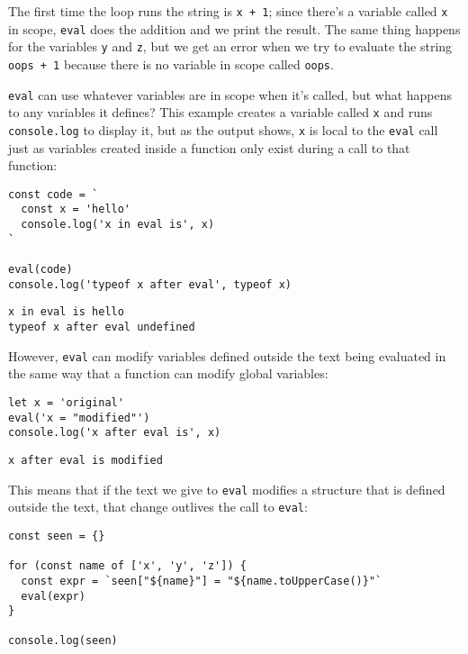 \documentclass[krantzl]{krantz}
\begin{document}
\noindent The first time the loop runs the string is \texttt{{\textquotesingle}x + 1{\textquotesingle}};
since there’s a variable called \texttt{x} in scope,
\texttt{eval} does the addition and we print the result.
The same thing happens for the variables \texttt{y} and \texttt{z},
but we get an error when we try to evaluate the string \texttt{{\textquotesingle}oops + 1{\textquotesingle}}
because there is no variable in scope called \texttt{oops}.


\texttt{eval} can use whatever variables are in scope when it’s called,
but what happens to any variables it defines?
This example creates a variable called \texttt{x} and runs \texttt{console.log} to display it,
but as the output shows,
\texttt{x} is local to the \texttt{eval} call
just as variables created inside a function
only exist during a call to that function:


\begin{lstlisting}[frame=tblr]
const code = `
  const x = 'hello'
  console.log('x in eval is', x)
`

eval(code)
console.log('typeof x after eval', typeof x)
\end{lstlisting}



\begin{lstlisting}[frame=tblr,backgroundcolor=\color{black!5}]
x in eval is hello
typeof x after eval undefined
\end{lstlisting}



However,
\texttt{eval} can modify variables defined outside the text being evaluated
in the same way that a function can modify global variables:


\begin{lstlisting}[frame=tblr]
let x = 'original'
eval('x = "modified"')
console.log('x after eval is', x)
\end{lstlisting}



\begin{lstlisting}[frame=tblr,backgroundcolor=\color{black!5}]
x after eval is modified
\end{lstlisting}



\noindent This means that
if the text we give to \texttt{eval} modifies a structure that is defined outside the text,
that change outlives the call to \texttt{eval}:


\begin{lstlisting}[frame=tblr]
const seen = {}

for (const name of ['x', 'y', 'z']) {
  const expr = `seen["${name}"] = "${name.toUpperCase()}"`
  eval(expr)
}

console.log(seen)
\end{lstlisting}
\end{document}
